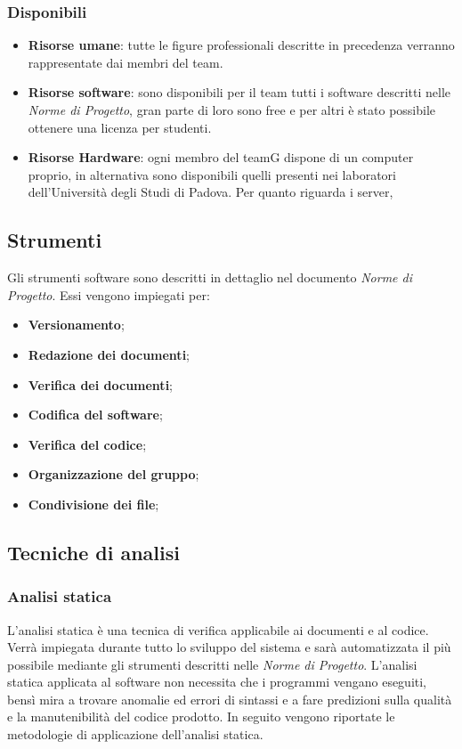 \subsubsection{Disponibili}
\begin{itemize}
\item \textbf{Risorse umane}: tutte le figure professionali descritte in precedenza verranno rappresentate dai membri del team.
\item \textbf{Risorse software}: sono disponibili per il team tutti i software descritti nelle \textit{Norme di Progetto}, gran parte di loro sono free e per altri è stato possibile ottenere una licenza per studenti.
\item \textbf{Risorse Hardware}: ogni membro del teamG dispone di un computer proprio, in alternativa sono disponibili quelli presenti nei laboratori dell’Università degli Studi di Padova. Per quanto riguarda i server,
\end{itemize}


\subsection{Strumenti}
Gli strumenti software sono descritti in dettaglio nel documento \textit{Norme di Progetto}. Essi vengono impiegati per:
\begin{itemize}
\item \textbf{Versionamento};
\item \textbf{Redazione dei documenti};
\item \textbf{Verifica dei documenti};
\item \textbf{Codifica del software};
\item \textbf{Verifica del codice};
\item \textbf{Organizzazione del gruppo};
\item \textbf{Condivisione dei file};
\end{itemize}


\subsection{Tecniche di analisi}

\subsubsection{Analisi statica}
L’analisi statica è una tecnica di verifica applicabile ai documenti e al codice. Verrà impiegata durante tutto lo sviluppo del sistema e sarà automatizzata il più possibile mediante gli strumenti descritti nelle \textit{Norme di Progetto}. L’analisi statica applicata al software non necessita che i programmi vengano eseguiti, bensì mira a trovare anomalie ed errori di sintassi e a fare predizioni sulla qualità e la manutenibilità del codice prodotto. In seguito vengono riportate le metodologie di applicazione dell’analisi statica.

